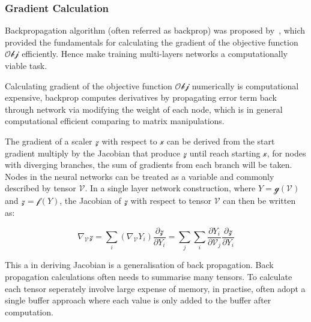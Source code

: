 \subsubsection{Gradient Calculation}
Backpropagation algorithm (often referred as backprop) was proposed by~\citet{werbos1975beyond}, which provided the fundamentals for calculating the gradient of the objective function $\mathcal{Obj}$ efficiently. Hence make training multi-layers networks a computationally viable task. 
\par
Calculating gradient of the objective function $\mathcal{Obj}$ numerically is computational expensive, backprop computes derivatives by propagating error term back through network via modifying the weight of each node, which is in general computational efficient comparing to matrix manipulations. 
\par
The gradient of a scaler $\mathcal{z}$ with respect to $\mathcal{x}$ can be derived from the start gradient multiply by the Jacobian that produce $\mathcal{z}$ until reach starting $\mathcal{x}$, for nodes with diverging branches, the sum of gradients from each branch will be taken. Nodes in the neural networks can be treated as a variable and commonly described by tensor $\mathcal{V}$. In a single layer network construction, where $Y=\mathcal{g}(\mathcal{V})$ and $\mathcal{z} = \mathcal{f}(Y)$, the Jacobian of $\mathcal{z}$ with respect to tensor $\mathcal{V}$ can then be written as:

\begin{equation}
    \nabla_{\mathcal{V}}\mathcal{z} = \sum_i (\nabla_{\mathcal{\mathcal{V}}} Y_i)\frac{\partial\mathcal{z}}{\partial Y_i} = \sum_j \sum_i \frac{\partial Y_i} {\partial{\mathcal{V}}_j}\frac{\partial\mathcal{z}}{\partial Y_i}
\end{equation}

This a in deriving Jacobian is a generalisation of back propagation. 
Back propagation calculations often needs to summarise many tensors. To calculate each tensor seperately involve large expense of memory, in practise, often adopt a single buffer approach where each value is only added to the buffer after computation.